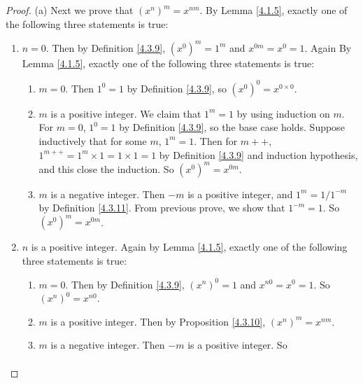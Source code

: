 \begin{proof}{(a)}
    Next we prove that \((x^n)^m = x^{nm}\).
    By Lemma \ref{4.1.5}, exactly one of the following three statements is true:
    \begin{enumerate}[label=(\Roman*)]
        \item \(n = 0\).
              Then by Definition \ref{4.3.9}, \((x^0)^m = 1^m\) and \(x^{0m} = x^0 = 1\).
              Again By Lemma \ref{4.1.5}, exactly one of the following three statements is true:
              \begin{enumerate}[label=(\roman*)]
                  \item \(m = 0\).
                        Then \(1^0 = 1\) by Definition \ref{4.3.9}, so \((x^0)^0 = x^{0 \times 0}\).
                  \item \(m\) is a positive integer.
                        We claim that \(1^m = 1\) by using induction on \(m\).
                        For \(m = 0\), \(1^0 = 1\) by Definition \ref{4.3.9}, so the base case holds.
                        Suppose inductively that for some \(m\), \(1^m = 1\).
                        Then for \(m++\), \(1^{m++} = 1^m \times 1 = 1 \times 1 = 1\) by Definition \ref{4.3.9} and induction hypothesis, and this close the induction.
                        So \((x^0)^m = x^{0m}\).
                  \item \(m\) is a negative integer.
                        Then \(-m\) is a positive integer, and \(1^m = 1 / 1^{-m}\) by Definition \ref{4.3.11}.
                        From previous prove, we show that \(1^{-m} = 1\).
                        So \((x^0)^m = x^{0m}\).
              \end{enumerate}
        \item \(n\) is a positive integer.
              Again by Lemma \ref{4.1.5}, exactly one of the following three statements is true:
              \begin{enumerate}[label=(\roman*)]
                  \item \(m = 0\).
                        Then by Definition \ref{4.3.9}, \((x^n)^0 = 1\) and \(x^{n0} = x^0 = 1\).
                        So \((x^n)^0 = x^{n0}\).
                  \item \(m\) is a positive integer.
                        Then by Proposition \ref{4.3.10}, \((x^n)^m = x^{nm}\).
                  \item \(m\) is a negative integer.
                        Then \(-m\) is a positive integer.
                        So
                        \begin{align*}

\end{align*}
\end{enumerate}
\end{enumerate}
\end{proof}
